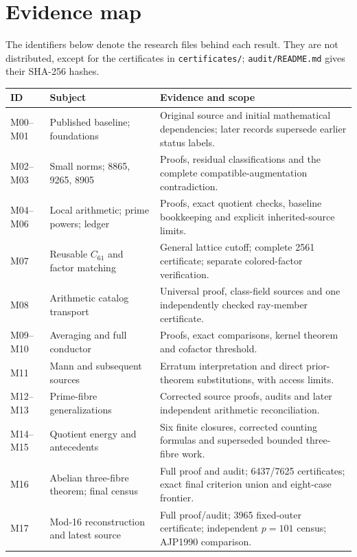 \documentclass[11pt]{article}
\theoremstyle{definition}
\theoremstyle{remark}
\begin{document}
\section{Evidence map}\label{app:evidence}
The identifiers below denote the research files behind each result. They
are not distributed, except for the certificates in \texttt{certificates/};
\texttt{audit/README.md} gives their SHA-256 hashes.
\begin{longtable}{lp{}p{}}
\toprule
ID & Subject & Evidence and scope\\
\midrule\endhead
M00--M01&Published baseline; foundations&Original source and initial mathematical dependencies; later records supersede earlier status labels.\\
M02--M03&Small norms; 8865, 9265, 8905&Proofs, residual classifications and the complete compatible-augmentation contradiction.\\
M04--M06&Local arithmetic; prime powers; ledger&Proofs, exact quotient checks, baseline bookkeeping and explicit inherited-source limits.\\
M07&Reusable $C_{61}$ and factor matching&General lattice cutoff; complete 2561 certificate; separate colored-factor verification.\\
M08&Arithmetic catalog transport&Universal proof, class-field sources and one independently checked ray-member certificate.\\
M09--M10&Averaging and full conductor&Proofs, exact comparisons, kernel theorem and cofactor threshold.\\
M11&Mann and subsequent sources&Erratum interpretation and direct prior-theorem substitutions, with access limits.\\
M12--M13&Prime-fibre generalizations&Corrected source proofs, audits and later independent arithmetic reconciliation.\\
M14--M15&Quotient energy and antecedents&Six finite closures, corrected counting formulas and superseded bounded three-fibre work.\\
M16&Abelian three-fibre theorem; final census&Full proof and audit; 6437/7625 certificates; exact final criterion union and eight-case frontier.\\
M17&Mod-16 reconstruction and latest source&Full proof/audit; 3965 fixed-outer certificate; independent $p=101$ census; AJP1990 comparison.\\
\bottomrule
\end{longtable}
\end{document}
